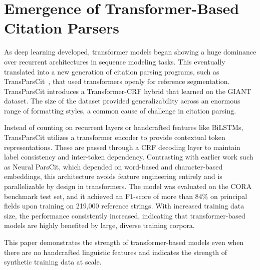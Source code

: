 \section[Emergence of Transformer-Based Citation Parsers]{Emergence of Transformer-Based\\ Citation Parsers}
As deep learning developed, transformer models began showing a huge dominance over recurrent architectures in sequence modeling tasks. This eventually translated into a new generation of citation parsing programs, such as TransParsCit~\cite{transparscit}, that used transformers openly for reference segmentation.
TransParsCit introduces a Transformer-CRF hybrid that learned on the GIANT dataset. The size of the dataset provided generalizability across an enormous range of formatting styles, a common cause of challenge in citation parsing.

Instead of counting on recurrent layers or handcrafted features like BiLSTMs, TransParsCit utilizes a transformer encoder to provide contextual token representations. These are passed through a CRF decoding layer to maintain label consistency and inter-token dependency. Contrasting with earlier work such as Neural ParsCit, which depended on word-based and character-based embeddings, this architecture avoids feature engineering entirely and is parallelizable by design in transformers.
The model was evaluated on the CORA benchmark test set, and it achieved an F1-score of more than 84\% on principal fields upon training on 219,000 reference strings. With increased training data size, the performance consistently increased, indicating that transformer-based models are highly benefited by large, diverse training corpora.

This paper demonstrates the strength of transformer-based models even when there are no handcrafted linguistic features and indicates the strength of synthetic training data at scale.



